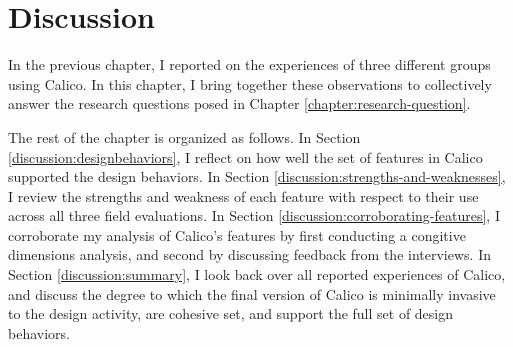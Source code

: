 \chapter{Discussion}
\label{chapter:discussion}

In the previous chapter, I reported on the experiences of three different groups using Calico. In this chapter, I bring together these observations to collectively answer the research questions posed in Chapter \ref{chapter:research-question}. 

The rest of the chapter is organized as follows. In Section \ref{discussion:designbehaviors}, I reflect on how well the set of features in Calico supported the design behaviors. In Section \ref{discussion:strengths-and-weaknesses}, I review the strengths and weakness of each feature with respect to their use across all three field evaluations. In Section \ref{discussion:corroborating-features}, I corroborate my analysis of Calico's features by first conducting a congitive dimensions analysis, and second by discussing feedback from the interviews. In Section \ref{discussion:summary}, I look back over all reported experiences of Calico, and discuss the degree to which the final version of Calico is minimally invasive to the design activity, are cohesive set, and support the full set of design behaviors.




